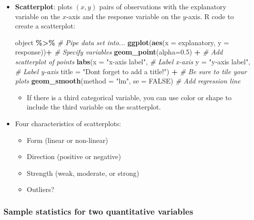 \documentclass[
]{report}
\newenvironment{Shaded}{\begin{snugshade}}{\end{snugshade}}
\newcommand{\AttributeTok}[1]{\textcolor[rgb]{0.13,0.29,0.53}{#1}}
\newcommand{\CommentTok}[1]{\textcolor[rgb]{0.56,0.35,0.01}{\textit{#1}}}
\newcommand{\ConstantTok}[1]{\textcolor[rgb]{0.56,0.35,0.01}{#1}}
\newcommand{\FloatTok}[1]{\textcolor[rgb]{0.00,0.00,0.81}{#1}}
\newcommand{\FunctionTok}[1]{\textcolor[rgb]{0.13,0.29,0.53}{\textbf{#1}}}
\newcommand{\NormalTok}[1]{#1}
\newcommand{\SpecialCharTok}[1]{\textcolor[rgb]{0.81,0.36,0.00}{\textbf{#1}}}
\newcommand{\StringTok}[1]{\textcolor[rgb]{0.31,0.60,0.02}{#1}}
\providecommand{\tightlist}{%
  \setlength{\itemsep}{0pt}\setlength{\parskip}{0pt}}
\begin{document}
\begin{itemize}
\item
  \textbf{Scatterplot}: plots \((x,y)\) pairs of observations with the explanatory variable on the \(x\)-axis and the response variable on the \(y\)-axis. R code to create a scatterplot:

\begin{Shaded}
\begin{Highlighting}[]
\NormalTok{object }\SpecialCharTok{\%\textgreater{}\%} \CommentTok{\# Pipe data set into...}
\FunctionTok{ggplot}\NormalTok{(}\FunctionTok{aes}\NormalTok{(}\AttributeTok{x =}\NormalTok{ explanatory, }\AttributeTok{y =}\NormalTok{ response))}\SpecialCharTok{+}  \CommentTok{\# Specify variables}
  \FunctionTok{geom\_point}\NormalTok{(}\AttributeTok{alpha=}\FloatTok{0.5}\NormalTok{) }\SpecialCharTok{+}  \CommentTok{\# Add scatterplot of points}
  \FunctionTok{labs}\NormalTok{(}\AttributeTok{x =} \StringTok{"x{-}axis label"}\NormalTok{,  }\CommentTok{\# Label x{-}axis}
   \AttributeTok{y =} \StringTok{"y{-}axis label"}\NormalTok{,  }\CommentTok{\# Label y{-}axis}
   \AttributeTok{title =} \StringTok{"Don\textquotesingle{}t forget to add a title!"}\NormalTok{) }\SpecialCharTok{+} 
           \CommentTok{\# Be sure to tile your plots}
  \FunctionTok{geom\_smooth}\NormalTok{(}\AttributeTok{method =} \StringTok{"lm"}\NormalTok{, }\AttributeTok{se =} \ConstantTok{FALSE}\NormalTok{)  }\CommentTok{\# Add regression line}
\end{Highlighting}
\end{Shaded}

  \begin{itemize}
  \tightlist
  \item
    If there is a third categorical variable, you can use color or shape to include the third variable on the scatterplot.
  \end{itemize}
\item
  Four characteristics of scatterplots:

  \begin{itemize}
  \item
    Form (linear or non-linear)
  \item
    Direction (positive or negative)
  \item
    Strength (weak, moderate, or strong)
  \item
    Outliers?
  \end{itemize}
\end{itemize}

\subsubsection*{Sample statistics for two quantitative variables}\label{sample-statistics-for-two-quantitative-variables}
\end{document}
